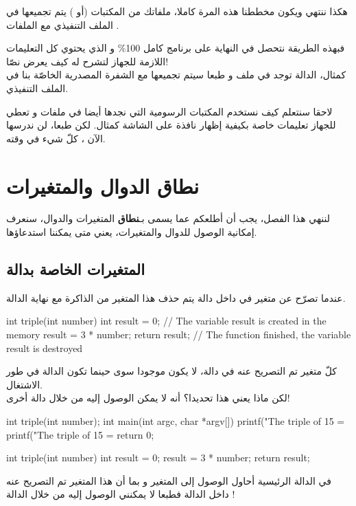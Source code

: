 هكذا ننتهي ويكون مخططنا هذه المرة كاملا، ملفاتك من المكتبات
(أو
)
يتم تجميعها في الملف التنفيذي مع الملفات
.

فبهذه الطريقة نتحصل في النهاية على برنامج كامل
100\%
و الذي يحتوي كل التعليمات اللازمة للجهاز لتشرح له كيف يعرض نصّا!\\
كمثال، الدالة
توجد في ملف
و طبعا سيتم تجميعها مع الشفرة المصدرية الخاصّة بنا في الملف التنفيذي.

لاحقا سنتعلم كيف نستخدم المكتبات الرسومية التي نجدها أيضا في ملفات
و تعطي للجهاز تعليمات خاصة بكيفية إظهار نافذة على الشاشة كمثال. لكن طبعا، لن ندرسها الآن ، كلّ شيء في وقته.

\section{نطاق الدوال والمتغيرات}

لننهي هذا الفصل، يجب أن أطلعكم عما يسمى بـ\textbf{نطاق}
المتغيرات والدوال، سنعرف إمكانية الوصول للدوال والمتغيرات، يعني متى يمكننا استدعاؤها.

\subsection{المتغيرات الخاصة بدالة}

عندما تصرّح عن متغير في داخل دالة يتم حذف هذا المتغير من الذاكرة مع نهاية الدالة.

\begin{Csource}
int triple(int number)
{
	int result = 0; // The variable result is created in the memory
	result = 3 * number;
	return result;
} // The function finished, the variable result is destroyed
\end{Csource}

كلّ متغير تم التصريح عنه في دالة، لا يكون موجودا سوى حينما تكون الدالة في طور الاشتغال.\\
لكن ماذا يعني هذا تحديدا؟ أنه لا يمكن الوصول إليه من خلال  دالة أخرى!

\begin{Csource}
int triple(int number);
int main(int argc, char *argv[])
{
	printf("The triple of 15 = %
	printf("The triple of 15 = %
	return 0;
}

int triple(int number)
{
	int result = 0;
	result = 3 * number;
	return result;
}
\end{Csource}

في الدالة الرئيسية أحاول الوصول إلى المتغير
و بما أن هذا المتغير تم التصريح عنه داخل الدالة
فطبعا لا يمكنني الوصول إليه من خلال الدالة
!

